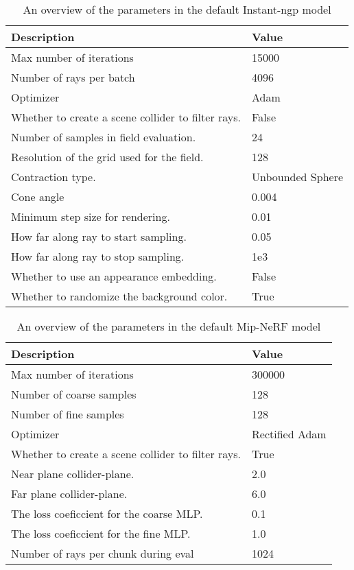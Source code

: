 \begin{table}[ht]
\caption[Overview of the default Instant-ngp model's parameters]{An overview of the parameters in the default Instant-ngp model}
\label{tab:instant-ngp-parameter-overview}
\centering
\begin{tabularx}{\textwidth}{|X|l|}
\hline
\textbf{Description} & \textbf{Value} \\ 
\hline
Max number of iterations & 15000 \\
Number of rays per batch & 4096 \\
Optimizer & Adam \\
Whether to create a scene collider to filter rays. & False \\
Number of samples in field evaluation. & 24 \\
Resolution of the grid used for the field. & 128 \\
Contraction type. & Unbounded Sphere \\
Cone angle & 0.004 \\
Minimum step size for rendering. & 0.01 \\
How far along ray to start sampling. & 0.05 \\
How far along ray to stop sampling. & 1e3 \\
Whether to use an appearance embedding. & False \\
Whether to randomize the background color. & True \\ \hline
\end{tabularx}
\end{table}

\begin{table}[ht]
\caption[Overview of the default Mip-NeRF model's parameters]{An overview of the parameters in the default Mip-NeRF model}
\label{tab:mip-nerf-parameter-overview}
\centering
\begin{tabularx}{\textwidth}{|X|l|}
\hline
\textbf{Description} & \textbf{Value} \\ 
\hline
Max number of iterations & 300000 \\
Number of coarse samples & 128 \\
Number of fine samples & 128 \\
Optimizer & Rectified Adam \\
Whether to create a scene collider to filter rays.  & True \\
Near plane collider-plane.                          & 2.0 \\
Far plane collider-plane.                           & 6.0 \\
The loss coeficcient for the coarse MLP.            & 0.1 \\
The loss coeficcient for the fine MLP.              & 1.0 \\
Number of rays per chunk during eval                & 1024 \\
\hline
\end{tabularx}
\end{table}


